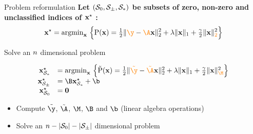 \documentclass[10pt]{beamer}
\newcommand{\emphone}[1]{{\color{orange}#1}}
\begin{document}
\begin{frame}{Problem reformulation}
  \textbf{Let $(\mathcal{S}_0,\mathcal{S}_{\pm},\mathcal{S}_*)$ be subsets of zero, non-zero and unclassified indices of $\mathbf{x}^{\star}$ :}
  \begin{equation*}
    \pvopt = \argmin_{\pv} \ 
    \Big\{
    \pfunc(\pv) = 
      \tfrac{1}{2}\norm{\emphone{\obs}-\emphone{\dic}\pv}{2}^2
      + \regone \norm{\pv}{1}
      + \tfrac{\regtwo}{2} \|\pv\|_{\emphone{2}}^2
    \Big\}
  \end{equation*}

  \pause
  \begin{center}
    Solve an $n$ dimensional problem
  \end{center}

  \pause
  \vspace{-0.2cm}
  \begin{center}
    \vspace{0.1cm}
  \end{center}
  \vspace{-0.2cm}

  \begin{equation*}
    \begin{array}{rl}
      \pvopt_{\setund} &= \argmin_{\pv} \ 
      \Big\{
      \reduced{\pfunc}(\pv) = 
        \tfrac{1}{2}\norm{\emphone{\reduced{\obs}}-\emphone{\reduced{\dic}}\pv}{2}^2
        + \regone \norm{\pv}{1}
        + \tfrac{\regtwo}{2} \|\pv\|_{\emphone{\matnorm}}^2
      \Big\} \\
      \pvopt_{\setposneg} &= \matred\pvopt_{\setund} + \vecred \\
      \pvopt_{\setnul} &= \0
    \end{array}
  \end{equation*}

  \pause
  \begin{itemize}
    \item Compute $\reduced{\obs}$, $\reduced{\dic}$, $\matnorm$, $\matred$ and $\vecred$ (linear algebra operations)
    \item Solve an $n-|\mathcal{S}_0|-|\mathcal{S}_{\pm}|$ dimensional problem
  \end{itemize}
\end{frame}
\end{document}
